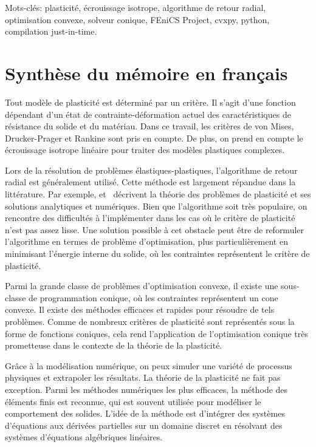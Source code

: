 \documentclass[12pt]{article}
\begin{document}
Mots-clés: plasticité, écrouissage isotrope, algorithme de retour radial, optimisation convexe, solveur conique, FEniCS Project, cvxpy, python, compilation just-in-time.

\newpage
\section*{\centering Synthèse du mémoire en français}
Tout modèle de plasticité est déterminé par un critère. Il s'agit d'une fonction dépendant d'un état de contrainte-déformation actuel des caractéristiques de résistance du solide et du matériau. Dans ce travail, les critères de von Mises, Drucker-Prager et Rankine sont pris en compte. De plus, on prend en compte le écrouissage isotrope linéaire pour traiter des modèles plastiques complexes.

Lors de la résolution de problèmes élastiques-plastiques, l'algorithme de retour radial est généralement utilisé. Cette méthode est largement répandue dans la littérature. Par exemple, \textcite{bonnet:hal-01083772} et~\textcite{nonlinear_FEM2012} décrivent la théorie des problèmes de plasticité et ses solutions analytiques et numériques. Bien que l'algorithme soit très populaire, on rencontre des difficultés à l'implémenter dans les cas où le critère de plasticité n'est pas assez lisse. Une solution possible à cet obstacle peut être de reformuler l'algorithme en termes de problème d'optimisation, plus particulièrement en minimisant l'énergie interne du solide, où les contraintes représentent le critère de plasticité.


Parmi la grande classe de problèmes d'optimisation convexe, il existe une sous-classe de programmation conique, où les contraintes représentent un cone convexe. Il existe des méthodes efficaces et rapides pour résoudre de tels problèmes. Comme de nombreux critères de plasticité sont représentés sous la forme de fonctions coniques, cela rend l'application de l'optimisation conique très prometteuse dans le contexte de la théorie de la plasticité.

Grâce à la modélisation numérique, on peux simuler une variété de processus physiques et extrapoler les résultats. La théorie de la plasticité ne fait pas exception. Parmi les méthodes numériques les plus efficaces, la méthode des éléments finis est reconnue, qui est souvent utilisée pour modéliser le comportement des solides. L'idée de la méthode est d'intégrer des systèmes d'équations aux dérivées partielles sur un domaine discret en résolvant des systèmes d'équations algébriques linéaires. 
\end{document}
